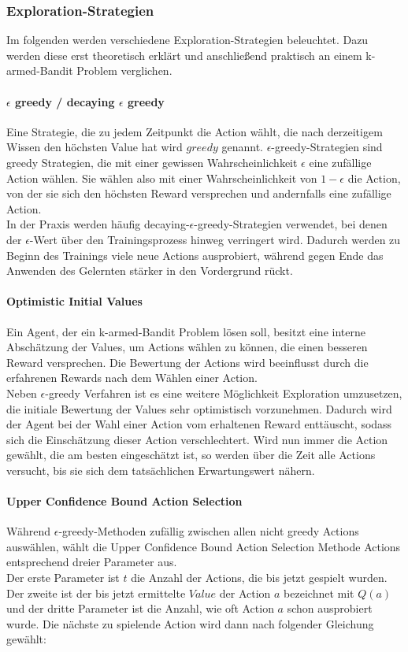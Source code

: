 \documentclass[11pt]{scrartcl}
\begin{document}
\subsubsection{Exploration-Strategien}
Im folgenden werden verschiedene Exploration-Strategien beleuchtet. Dazu werden diese erst
theoretisch erklärt und anschließend praktisch an einem k-armed-Bandit Problem verglichen.

\paragraph{$\epsilon$ greedy / decaying $\epsilon$ greedy}
Eine Strategie, die zu jedem Zeitpunkt die Action wählt, die nach derzeitigem Wissen den
höchsten Value hat wird $greedy$ genannt. $\epsilon$-greedy-Strategien sind greedy
Strategien, die mit einer gewissen Wahrscheinlichkeit $\epsilon$ eine zufällige Action
wählen. Sie wählen also mit einer Wahrscheinlichkeit von $1 - \epsilon$ die Action, von
der sie sich den höchsten Reward versprechen und andernfalls eine zufällige Action.\\
In der Praxis werden häufig decaying-$\epsilon$-greedy-Strategien verwendet, bei denen der
$\epsilon$-Wert über den Trainingsprozess hinweg verringert wird. Dadurch werden zu Beginn
des Trainings viele neue Actions ausprobiert, während gegen Ende das Anwenden des
Gelernten stärker in den Vordergrund rückt.

\paragraph{Optimistic Initial Values}
Ein Agent, der ein k-armed-Bandit Problem lösen soll, besitzt eine interne Abschätzung der
Values, um Actions wählen zu können, die einen besseren Reward versprechen. Die
Bewertung der Actions wird beeinflusst durch die erfahrenen Rewards nach dem Wählen einer
Action.\\
Neben $\epsilon$-greedy Verfahren ist es eine weitere Möglichkeit Exploration umzusetzen,
die initiale Bewertung der Values sehr optimistisch vorzunehmen. Dadurch wird der Agent
bei der Wahl einer Action vom erhaltenen Reward \grqq enttäuscht\grqq, sodass sich die
Einschätzung dieser Action verschlechtert. Wird nun immer die Action gewählt, die am
besten eingeschätzt ist, so werden über die Zeit alle Actions versucht, bis sie sich dem
tatsächlichen Erwartungswert nähern.

\paragraph{Upper Confidence Bound Action Selection}
Während $\epsilon$-greedy-Methoden zufällig zwischen allen nicht greedy Actions
auswählen, wählt die Upper Confidence Bound Ac\-tion Selection Methode Actions entsprechend
dreier Parameter aus.\\
Der erste Parameter ist $t$ die Anzahl der Actions, die bis jetzt gespielt wurden. Der
zweite ist der bis jetzt ermittelte $Value$ der Action $a$ bezeichnet mit $Q(a)$ und der
dritte Parameter ist die Anzahl, wie oft Action $a$ schon ausprobiert wurde. Die nächste
zu spielende Action wird dann nach folgender Gleichung gewählt:
\end{document}
